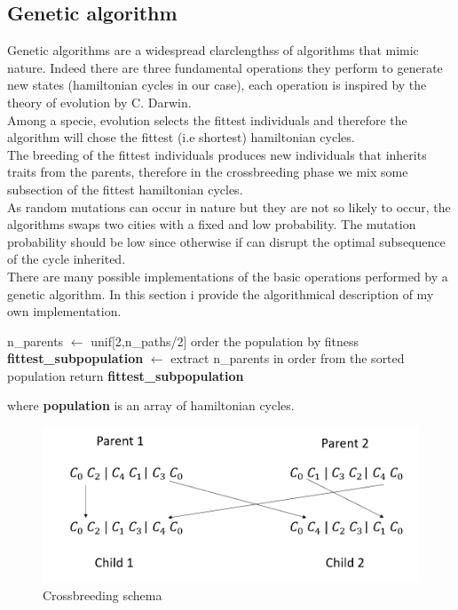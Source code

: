 \documentclass{article}
\begin{document}
\subsection{Genetic algorithm}
Genetic algorithms are a widespread clarclengthss of algorithms that mimic nature. Indeed there are three fundamental operations they perform to generate new states (hamiltonian cycles in our case), each operation is inspired by the theory of evolution by C. Darwin. \\
Among a specie, evolution selects the fittest individuals and therefore the algorithm will chose the fittest (i.e shortest) hamiltonian cycles. \\
The breeding of the fittest individuals produces new individuals that inherits traits from the parents, therefore in the crossbreeding phase we mix some subsection of the fittest hamiltonian cycles. \\
As random mutations can occur in nature but they are not so likely to occur, the algorithms swaps two cities with a fixed and low probability. The mutation probability should be low since otherwise if can disrupt the optimal subsequence of the cycle inherited. \\
There are many possible implementations of the basic operations performed by a genetic algorithm. In this section i provide the algorithmical description of my own implementation.
\begin{algorithm}[H]
    \begin{algorithmic}[1]
        \State n\_parents $\leftarrow$ unif[2,n\_paths/2]
        \State order the population by fitness
        \State \textbf{fittest\_subpopulation} $\leftarrow$ extract n\_parents in order from the sorted population
        \State return \textbf{fittest\_subpopulation}
       \EndFunction
\end{algorithmic}
\end{algorithm}
\noindent where \textbf{population} is an array of hamiltonian cycles.


\begin{figure}[H]\includegraphics[scale=0.5]{crossbreeding.png} 
\centering
\caption{Crossbreeding schema}
\end{figure}
\end{document}
